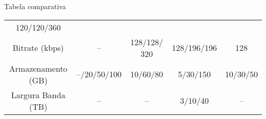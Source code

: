 \begin{frame}{Tabela comparativa}
\begin{longtable}[]{@{}ccccc@{}}
\begin{minipage}[t]{0.17\columnwidth}
120/120/360\strut
\end{minipage}\tabularnewline
\begin{minipage}[t]{0.20\columnwidth}\centering\strut
Bitrate (kbps)\strut
\end{minipage} & \begin{minipage}[t]{0.18\columnwidth}\centering\strut
--\strut
\end{minipage} & \begin{minipage}[t]{0.14\columnwidth}\centering\strut
128/128/ 320\strut
\end{minipage} & \begin{minipage}[t]{0.17\columnwidth}\centering\strut
128/196/196\strut
\end{minipage} & \begin{minipage}[t]{0.17\columnwidth}\centering\strut
128\strut
\end{minipage}\tabularnewline
\begin{minipage}[t]{0.20\columnwidth}\centering\strut
Armazenamento (GB)\strut
\end{minipage} & \begin{minipage}[t]{0.18\columnwidth}\centering\strut
--/20/50/100\strut
\end{minipage} & \begin{minipage}[t]{0.14\columnwidth}\centering\strut
10/60/80\strut
\end{minipage} & \begin{minipage}[t]{0.17\columnwidth}\centering\strut
5/30/150\strut
\end{minipage} & \begin{minipage}[t]{0.17\columnwidth}\centering\strut
10/30/50\strut
\end{minipage}\tabularnewline
\begin{minipage}[t]{0.20\columnwidth}\centering\strut
Largura Banda (TB)\strut
\end{minipage} & \begin{minipage}[t]{0.18\columnwidth}\centering\strut
--\strut
\end{minipage} & \begin{minipage}[t]{0.14\columnwidth}\centering\strut
--\strut
\end{minipage} & \begin{minipage}[t]{0.17\columnwidth}\centering\strut
3/10/40\strut
\end{minipage} & \begin{minipage}[t]{0.17\columnwidth}\centering\strut
--\strut
\end{minipage}\tabularnewline

\end{longtable}
\end{frame}
